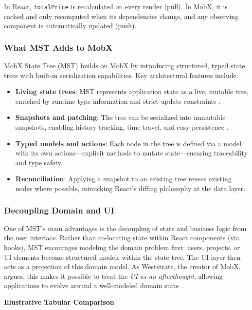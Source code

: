 \documentclass[oneside,12pt]{book}
\begin{document}
In React, \texttt{totalPrice} is recalculated on every render (pull). In MobX, it is cached and only recomputed when its dependencies change, and any observing component is automatically updated (push).

\subsubsection{What MST Adds to MobX}

MobX State Tree (MST) builds on MobX by introducing structured, typed state trees with built-in serialization capabilities. Key architectural features include:

\begin{itemize}
  \item \textbf{Living state trees}: MST represents application state as a live, mutable tree, enriched by runtime type information and strict update constraints \cite{mobx_docs}.
  \item \textbf{Snapshots and patching}: The tree can be serialized into immutable snapshots, enabling history tracking, time travel, and easy persistence \cite{mobx_docs}.
  \item \textbf{Typed models and actions}: Each node in the tree is defined via a model with its own actions—explicit methods to mutate state—ensuring traceability and type safety.
  \item \textbf{Reconciliation}: Applying a snapshot to an existing tree reuses existing nodes where possible, mimicking React’s diffing philosophy at the data layer.
\end{itemize}

\subsubsection{Decoupling Domain and UI}

One of MST’s main advantages is the decoupling of state and business logic from the user interface. 
Rather than co-locating state within React components (via hooks), MST encourages modeling the domain problem first: users, projects, or UI elements become structured models within the state tree. 
The UI layer then acts as a projection of this domain model. 
As Weststrate, the creator of MobX, argues, this makes it possible to treat the \emph{UI as an afterthought}, allowing applications to evolve around a well-modeled domain state \cite{weststrate_ui}.

\textbf{Illustrative Tabular Comparison}
\end{document}
